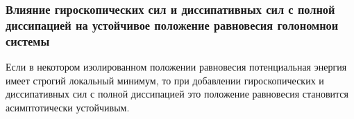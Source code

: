 \subsubsection*{Влияние гироскопических сил и диссипативных сил с полной диссипацией на устойчивое положение равновесия голономнои системы}


\begin{to_thr}
    Если в некотором изолированном положении равновесия потенциальная энергия имеет строгий локальный минимум, то при добавлении гироскопических и диссипативных сил с полной диссипацией это положение равновесия становится асимптотически устойчивым.
\end{to_thr}















